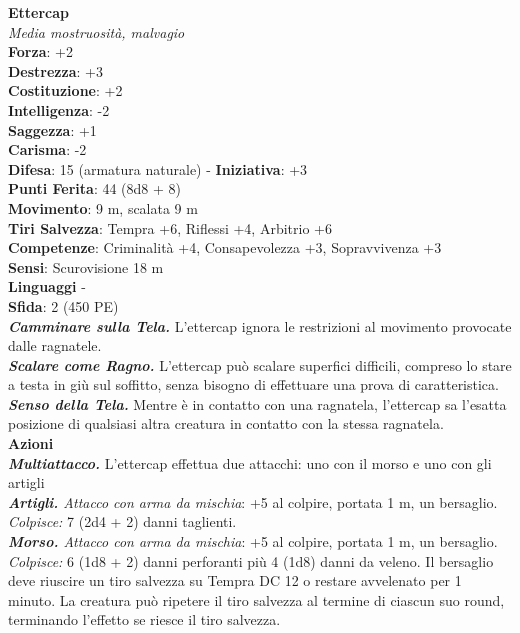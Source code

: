\begin{multicols}{2}
\medskip\textbf{Ettercap}\\
\emph{Media mostruosità, malvagio}\\
\textbf{Forza}: +2\\
\textbf{Destrezza}: +3\\
\textbf{Costituzione}: +2\\
\textbf{Intelligenza}: -2\\
\textbf{Saggezza}: +1\\
\textbf{Carisma}: -2\\
\textbf{Difesa}: 15 (armatura naturale) - \textbf{Iniziativa}: +3\\
\textbf{Punti Ferita}: 44 (8d8 + 8)\\
\textbf{Movimento}: 9 m, scalata 9 m\\
\textbf{Tiri Salvezza}: Tempra +6, Riflessi +4, Arbitrio +6\\
\textbf{Competenze}: Criminalità +4, Consapevolezza +3, Sopravvivenza +3\\
\textbf{Sensi}: Scurovisione 18 m\\
\textbf{Linguaggi} -\\
\textbf{Sfida}: 2 (450 PE)\smallskip\\
\emph{\textbf{Camminare sulla Tela.}} L'ettercap ignora le restrizioni al movimento provocate dalle ragnatele.\\
\emph{\textbf{Scalare come Ragno.}} L'ettercap può scalare superfici difficili, compreso lo stare a testa in giù sul soffitto, senza bisogno di effettuare una prova di caratteristica.\\
\emph{\textbf{Senso della Tela.}} Mentre è in contatto con una ragnatela, l'ettercap sa l'esatta posizione di qualsiasi altra creatura in contatto con la stessa ragnatela.\\
\smallskip\textbf{Azioni}\\
\emph{\textbf{Multiattacco.}} L'ettercap effettua due attacchi: uno con il morso e uno con gli artigli\\
\emph{\textbf{Artigli.} Attacco con arma da mischia}: +5 al colpire, portata 1 m, un bersaglio.\\
\emph{Colpisce:} 7 (2d4 + 2) danni taglienti.\\
\emph{\textbf{Morso.} Attacco con arma da mischia}: +5 al colpire, portata 1 m, un bersaglio.\\
\emph{Colpisce:} 6 (1d8 + 2) danni perforanti più 4 (1d8) danni da veleno. Il bersaglio deve riuscire un tiro salvezza su Tempra DC  12 o restare avvelenato per 1 minuto. La creatura può ripetere il tiro salvezza al termine di ciascun suo round, terminando l'effetto se riesce il tiro salvezza.\\

\end{multicols}
